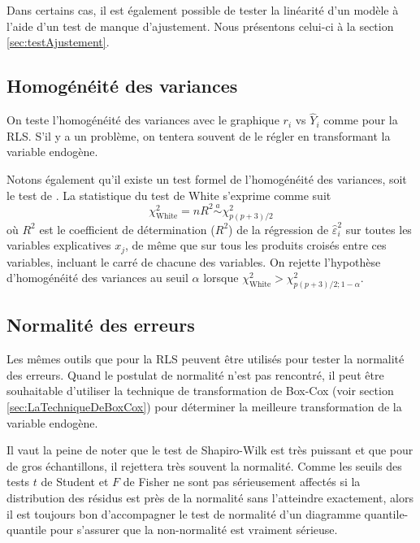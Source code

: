 \vspace{0.05 in}
Dans certains cas, il est également possible de tester la linéarité d'un modèle à l'aide d'un test de manque d'ajustement. Nous présentons celui-ci à la section \ref{sec:testAjustement}.

\newpage

\subsection{Homogénéité des variances}

On teste l'homogénéité des variances avec le graphique $r_i$ vs $\hat{Y}_i$ comme pour la RLS. S'il y a un problème, on tentera souvent de le régler en transformant la variable endogène.

Notons également qu'il existe un test formel de l'homogénéité des variances, soit le test de \citet{Whi:1980}. La statistique du test de White s'exprime comme suit
$$\chi^2_{\text{White}} = nR^2 \overset{a}{\sim} \chi^2_{p(p+3)/2}$$
o\`u $R^2$ est le coefficient de détermination ($R^2$) de la régression de $\hat\varepsilon_i^2$ sur toutes les variables explicatives $x_j$, de m\^eme que sur tous les produits croisés entre ces variables, incluant le carré de chacune des variables. On rejette l'hypothèse d'homogénéité des variances au seuil
$\alpha$ lorsque $\chi^2_{\text{White}}>\chi^2_{p(p+3)/2;1-\alpha}$.

\subsection{Normalité des erreurs}

Les mêmes outils que pour la RLS peuvent être utilisés pour tester la normalité des erreurs. Quand le postulat de normalité n'est pas rencontré, il peut \^etre souhaitable  d'utiliser la technique de transformation de Box-Cox (voir section \ref{sec:LaTechniqueDeBoxCox}) pour déterminer la meilleure transformation de la variable endogène.

Il vaut la peine de noter que le test de Shapiro-Wilk est très puissant et que
pour de gros échantillons, il rejettera très souvent la
normalité. Comme les seuils des tests $t$ de Student et $F$ de Fisher ne sont pas
sérieusement affectés si la distribution des résidus est
près de la normalité sans l'atteindre exactement, alors il est
toujours bon d'accompagner le test de normalité d'un diagramme quantile-quantile pour s'assurer que la non-normalité est vraiment sérieuse.

